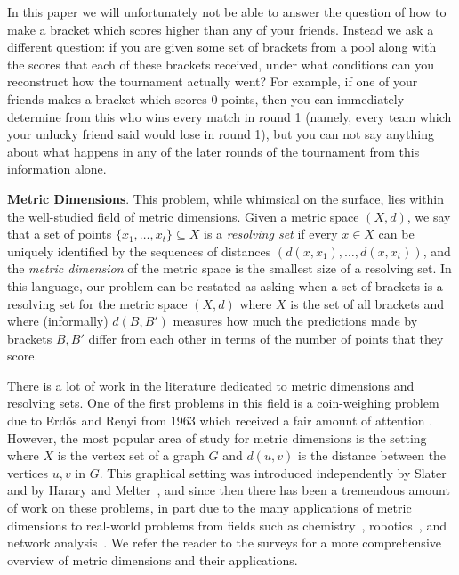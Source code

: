 \documentclass[12pt,letterpaper]{article}
\theoremstyle{definition}
\renewcommand{\1}{\mathbbm{1}}
\newcommand{\sub}{\subseteq}
\begin{document}
In this paper we will unfortunately not be able to answer the question of how to make a bracket which scores higher than any of your friends.  Instead we ask a different question: if you are given some set of brackets from a pool along with the scores that each of these brackets received, under what conditions can you reconstruct how the tournament actually went?  For example, if one of your friends makes a bracket which scores 0 points, then you can immediately determine from this who wins every match in round 1 (namely, every team which your unlucky friend said would lose in round 1), but you can not say anything about what happens in any of the later rounds of the tournament from this information alone.

\textbf{Metric Dimensions}.  This problem, while whimsical on the surface, lies within the well-studied field of metric dimensions.  Given a metric space $(X,d)$, we say that a set of points $\{x_1,\ldots,x_t\}\sub X$ is a \textit{resolving set} if every $x\in X$ can be uniquely identified by the sequences of distances $(d(x,x_1),\ldots,d(x,x_t))$, and the \textit{metric dimension} of the metric space is the smallest size of a resolving set.  In this language, our problem can be restated as asking when a set of brackets is a resolving set for the metric space $(X,d)$ where $X$ is the set of all brackets and where (informally) $d(B,B')$ measures how much the predictions made by brackets $B,B'$ differ from each other in terms of the number of points that they score.

There is a lot of work in the literature dedicated to metric dimensions and resolving sets.  One of the first problems in this field is a coin-weighing problem due to Erd\H{o}s and Renyi from 1963 \cite{erdHos1963two} which received a fair amount of attention \cite{guy1995coin,lindstrom1964combinatory,soderberg1963combinatory}.  However, the most popular area of study for metric dimensions is the setting where $X$ is the vertex set of a graph $G$ and $d(u,v)$ is the distance between the vertices $u,v$ in $G$.  This graphical setting was introduced independently by Slater~\cite{slater1975leaves} and by Harary and Melter~\cite{harary1976metric}, and since then there has been a tremendous amount of work on these problems, in part due to the many applications of metric dimensions to real-world problems from fields such as chemistry~\cite{chartrand2000resolvability}, robotics~\cite{khuller1996landmarks}, and network analysis~\cite{beerliova2005network}.  We refer the reader to the surveys \cite{kuziak2021metric,tillquist2023getting} for a more comprehensive overview of metric dimensions and their applications.
\end{document}
